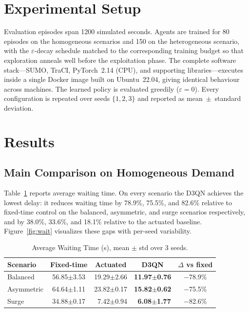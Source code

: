\documentclass[conference]{IEEEtran}
\begin{document}
\section{Experimental Setup}
\label{sec:setup}
Evaluation episodes span 1200 simulated seconds. Agents are trained for 80
episodes on the homogeneous scenarios and 150 on the heterogeneous scenario, with
the $\varepsilon$-decay schedule matched to the corresponding training budget so
that exploration anneals well before the exploitation phase. The complete
software stack---SUMO, TraCI, PyTorch~2.14 (CPU), and supporting
libraries---executes inside a single Docker image built on Ubuntu~22.04, giving
identical behaviour across machines. The learned policy is evaluated greedily
($\varepsilon=0$). Every configuration is repeated over seeds $\{1,2,3\}$ and
reported as mean~$\pm$~standard deviation.

\section{Results}
\label{sec:results}

\subsection{Main Comparison on Homogeneous Demand}
Table~\ref{tab:wait} reports average waiting time. On every scenario the D3QN
achieves the lowest delay: it reduces waiting time by 78.9\%, 75.5\%, and 82.6\%
relative to fixed-time control on the balanced, asymmetric, and surge scenarios
respectively, and by 38.0\%, 33.6\%, and 18.1\% relative to the actuated
baseline. Figure~\ref{fig:wait} visualizes these gaps with per-seed variability.

\begin{table}[t]
\caption{Average Waiting Time (s), mean $\pm$ std over 3 seeds.}
\label{tab:wait}
\centering
\begin{tabular}{@{}lcccc@{}}
\toprule
Scenario & Fixed-time & Actuated & \textbf{D3QN} & $\Delta$ vs fixed \\
\midrule
Balanced   & 56.85$\pm$3.53 & 19.29$\pm$2.66 & \textbf{11.97$\pm$0.76} & $-$78.9\% \\
Asymmetric & 64.64$\pm$1.11 & 23.82$\pm$0.17 & \textbf{15.82$\pm$0.62} & $-$75.5\% \\
Surge      & 34.88$\pm$0.17 & \ 7.42$\pm$0.94 & \ \textbf{6.08$\pm$1.77} & $-$82.6\% \\
\bottomrule
\end{tabular}
\end{table}
\end{document}
